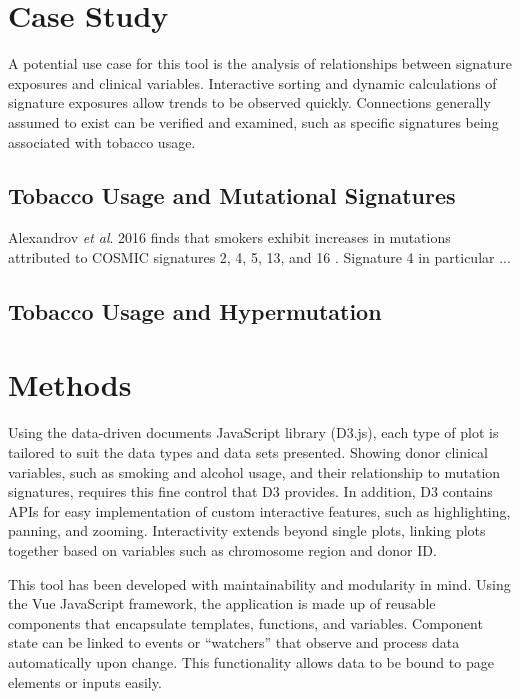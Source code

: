 \documentclass[12pt, letterpaper]{article}
\begin{document}
\section{Case Study}
A potential use case for this tool is the analysis of relationships between signature exposures and clinical variables.
Interactive sorting and dynamic calculations of signature exposures allow trends to be observed quickly.
Connections generally assumed to exist can be verified and examined, such as specific signatures being associated with tobacco usage.

\subsection{Tobacco Usage and Mutational Signatures}
Alexandrov \textit{et al}. 2016 finds that smokers exhibit increases in mutations attributed to COSMIC signatures 2, 4, 5, 13, and 16 \cite{alexandrov2016mutational}. 
Signature 4 in particular ...

\subsection{Tobacco Usage and Hypermutation}



\section{Methods}
Using the data-driven documents JavaScript library (D3.js)\cite{bostock2011d3}, each type of plot is tailored to suit the data types and data sets presented.
Showing donor clinical variables, such as smoking and alcohol usage, and their relationship to mutation signatures, requires this fine control that D3 provides.
In addition, D3 contains APIs for easy implementation of custom interactive features, such as highlighting, panning, and zooming.
Interactivity extends beyond single plots, linking plots together based on variables such as chromosome region and donor ID.


This tool has been developed with maintainability and modularity in mind.
Using the Vue JavaScript framework, the application is made up of reusable components that encapsulate templates, functions, and variables.
Component state can be linked to events or ``watchers'' that observe and process data automatically upon change.
This functionality allows data to be bound to page elements or inputs easily.
\end{document}
